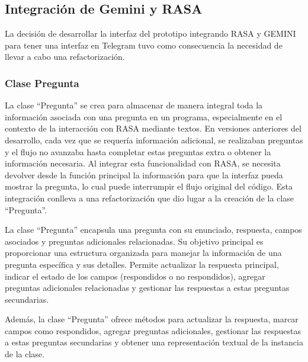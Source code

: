 \subsection{Integración de Gemini y RASA}
La decisión de desarrollar la interfaz del prototipo integrando RASA y GEMINI para tener una interfaz en Telegram tuvo como consecuencia la necesidad de llevar a cabo una refactorización.

\subsubsection{Clase Pregunta}
La clase ``Pregunta'' se crea para almacenar de manera integral toda la información asociada con una pregunta en un programa, especialmente en el contexto de la interacción con RASA mediante textos. En versiones anteriores del desarrollo, cada vez que se requería información adicional, se realizaban preguntas y el flujo no avanzaba hasta completar estas preguntas extra o obtener la información necesaria. Al integrar esta funcionalidad con RASA, se necesita devolver desde la función principal la información para que la interfaz pueda mostrar la pregunta, lo cual puede interrumpir el flujo original del código. Esta integración conlleva a una refactorización que dio lugar a la creación de la clase ``Pregunta''.

La clase ``Pregunta'' encapsula una pregunta con su enunciado, respuesta, campos asociados y preguntas adicionales relacionadas. Su objetivo principal es proporcionar una estructura organizada para manejar la información de una pregunta específica y sus detalles. Permite actualizar la respuesta principal, indicar el estado de los campos (respondidos o no respondidos), agregar preguntas adicionales relacionadas y gestionar las respuestas a estas preguntas secundarias.

Además, la clase ``Pregunta'' ofrece métodos para actualizar la respuesta, marcar campos como respondidos, agregar preguntas adicionales, gestionar las respuestas a estas preguntas secundarias y obtener una representación textual de la instancia de la clase.

